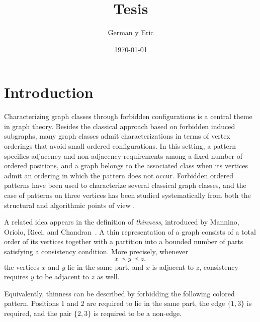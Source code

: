 \documentclass[12pt]{article}
\title{Tesis}
\author{German y Eric}
\date{\today}
\theoremstyle{plain}
\theoremstyle{definition}
\theoremstyle{remark}
\theoremstyle{definition}
\begin{document}
\maketitle
\tableofcontents


\section{Introduction}
\label{sec:introduction}

Characterizing graph classes through forbidden configurations is a central
theme in graph theory. Besides the classical approach based on forbidden
induced subgraphs, many graph classes admit characterizations in terms of
vertex orderings that avoid small ordered configurations. In this setting,
a pattern specifies adjacency and non-adjacency requirements among a fixed
number of ordered positions, and a graph belongs to the associated class
when its vertices admit an ordering in which the pattern does not occur.
Forbidden ordered patterns have been used to characterize several classical
graph classes, and the case of patterns on three vertices has been studied
systematically from both the structural and algorithmic points of view
\cite{HellMoharRafiey2014,FeuilloleyHabib2018}.

A related idea appears in the definition of \emph{thinness}, introduced by
Mannino, Oriolo, Ricci, and Chandran~\cite{Mannino2007}. A thin representation
of a graph consists of a total order of its vertices together with a partition
into a bounded number of parts satisfying a consistency condition. More
precisely, whenever
\[
x\prec y\prec z,
\]
the vertices \(x\) and \(y\) lie in the same part, and \(x\) is adjacent to
\(z\), consistency requires \(y\) to be adjacent to \(z\) as well.

Equivalently, thinness can be described by forbidding the following
colored pattern. Positions \(1\) and \(2\) are required to lie in the
same part, the edge \(\{1,3\}\) is required, and the pair \(\{2,3\}\)
is required to be a non-edge.

\begin{center}
\end{center}
\end{document}
